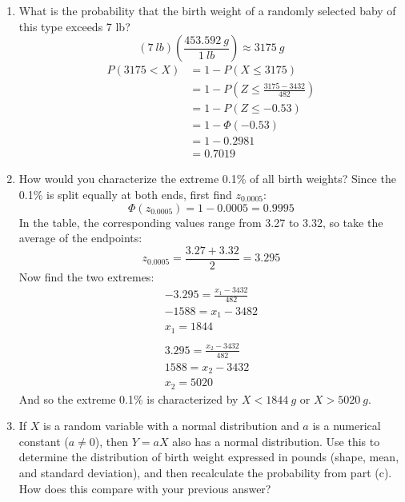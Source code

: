 \documentclass[letterpaper,12pt,fleqn]{article}
\renewcommand{\O}{\Phi}
\begin{document}
\begin{enumerate}[label={\alph*)}]
\item What is the probability that the birth weight of a randomly selected baby of this type exceeds 7 lb?
  \[(\SI{7}{lb})\left(\frac{\SI{453.592}{g}}{\SI{1}{lb}}\right)\approx\SI{3175}{g}\]
  \begin{align*}
    P(3175<X) &= 1-P(X\le3175) \\
    &= 1-P\left(Z\le\frac{3175-3432}{482}\right) \\
    &= 1-P(Z\le-0.53) \\
    &= 1-\O(-0.53) \\
    &= 1-0.2981 \\
    &= 0.7019
  \end{align*}

\item How would you characterize the extreme 0.1\% of all birth weights?
  Since the 0.1\% is split equally at both ends, first find \(z_{0.0005}\):
  \[\O(z_{0.0005})=1-0.0005=0.9995\]
  In the table, the corresponding values range from 3.27 to 3.32, so take the average of the endpoints:
  \[z_{0.0005}=\frac{3.27+3.32}{2}=3.295\]
  Now find the two extremes:
  \begin{gather*}
    -3.295=\frac{x_1-3432}{482} \\
    -1588=x_1-3482 \\
    x_1=1844 \\
    \\
    3.295=\frac{x_2-3432}{482} \\
    1588=x_2-3432 \\
    x_2=5020
  \end{gather*}
  And so the extreme 0.1\% is characterized by \(X<\SI{1844}{g}\) or \(X>\SI{5020}{g}\).

\item If \(X\) is a random variable with a normal distribution and \(a\) is a numerical constant (\(a\ne0\)), then \(Y=aX\)
  also has a normal distribution.  Use this to determine the distribution of birth weight expressed in pounds (shape, mean,
  and standard deviation), and then recalculate the probability from part (c).  How does this compare with your previous
  answer?


\end{enumerate}
\end{document}
